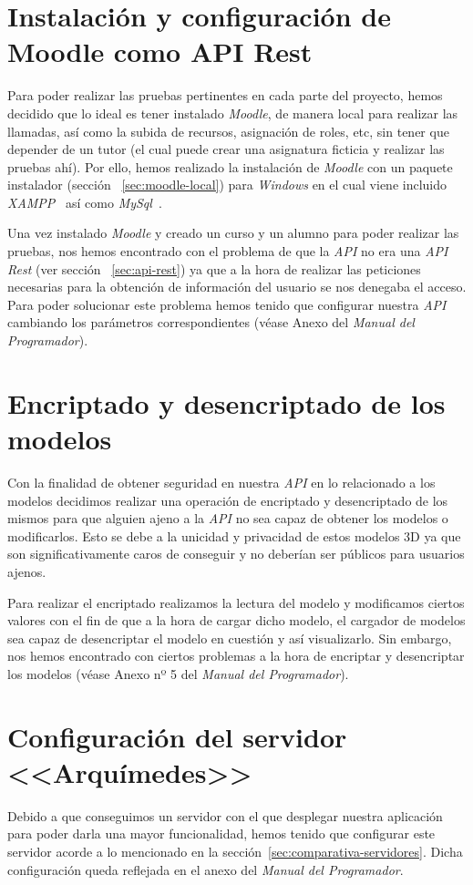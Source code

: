\section{Instalación y configuración de Moodle como API Rest}
Para poder realizar las pruebas pertinentes en cada parte del proyecto, hemos decidido que lo ideal es tener instalado \textit{Moodle}, de manera local para realizar las llamadas, así como la subida de recursos, asignación de roles, etc, sin tener que depender de un tutor (el cual puede crear una asignatura ficticia y realizar las pruebas ahí). Por ello, hemos realizado la instalación de \textit{Moodle} con un paquete instalador (sección ~\ref{sec:moodle-local}) para \textit{Windows} en el cual viene incluido \textit{XAMPP}~\cite{wiki:xampp} así como \textit{MySql}~\cite{wiki:mysql}.

Una vez instalado \textit{Moodle} y creado un curso y un alumno para poder realizar las pruebas, nos hemos encontrado con el problema de que la \textit{API} no era una \textit{API Rest} (ver sección ~\ref{sec:api-rest}) ya que a la hora de realizar las peticiones necesarias para la obtención de información del usuario se nos denegaba el acceso. Para poder solucionar este problema hemos tenido que configurar nuestra \textit{API} cambiando los parámetros correspondientes (véase Anexo del \textit{Manual del Programador}).

\section{Encriptado y desencriptado de los modelos}
Con la finalidad de obtener seguridad en nuestra \textit{API} en lo relacionado a los modelos decidimos realizar una operación de encriptado y desencriptado de los mismos para que alguien ajeno a la \textit{API} no sea capaz de obtener los modelos o modificarlos. Esto se debe a la unicidad y privacidad de estos modelos 3D ya que son significativamente caros de conseguir y no deberían ser públicos para usuarios ajenos.

Para realizar el encriptado realizamos la lectura del modelo y modificamos ciertos valores con el fin de que a la hora de cargar dicho modelo, el cargador de modelos sea capaz de desencriptar el modelo en cuestión y así visualizarlo. Sin embargo, nos hemos encontrado con ciertos problemas a la hora de encriptar y desencriptar los modelos (véase Anexo nº 5 del \textit{Manual del Programador}).

\section{Configuración del servidor <<Arquímedes>>}
Debido a que conseguimos un servidor con el que desplegar nuestra aplicación para poder darla una mayor funcionalidad, hemos tenido que configurar este servidor acorde a lo mencionado en la sección~\ref{sec:comparativa-servidores}. Dicha configuración queda reflejada en el anexo del \textit{Manual del Programador}.
